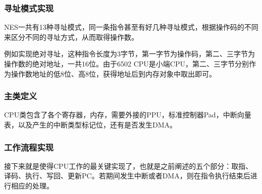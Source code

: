 \documentclass[a4paper]{ltxdoc}
\begin{document}
{%
\subsubsection{寻址模式实现}
NES一共有13种寻址模式，同一条指令甚至有好几种寻址模式，根据操作码的不同来区分不同的寻址方式，从而取得操作数。

例如实现绝对寻址，这种指令长度为3字节，第一字节为操作码，第二、三字节为操作数的绝对地址，一共16位。由于6502 CPU是小端CPU，第二、三字节分别作为操作数地址的低8位、高8位，获得地址后到内存对象中取出即可。

\subsubsection{主类定义}
CPU类包含了各个寄存器，内存，需要外接的PPU，标准控制器Pad，中断向量表，以及产生的中断类型标记位，还有是否发生DMA。

\subsubsection{工作流程实现}
接下来就是使得CPU工作的最关键实现了，也就是之前阐述的五个部分：取指、译码、执行、写回、更新PC。若期间发生中断或者DMA，则在指令执行结束后进行相应的处理。

}
\end{document}
